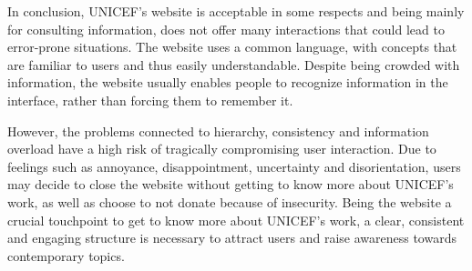 In conclusion, UNICEF’s website is acceptable in some respects and being mainly for consulting information, does not offer many interactions that could lead to error-prone situations. The website uses a common language, with concepts that are familiar to users and thus easily understandable. Despite being crowded with information, the website usually enables people to recognize information in the interface, rather than forcing them to remember it.

However, the problems connected to hierarchy, consistency and information overload have a high risk of tragically compromising user interaction. Due to feelings such as annoyance, disappointment, uncertainty and disorientation, users may decide to close the website without getting to know more about UNICEF’s work, as well as choose to not donate because of insecurity. Being the website a crucial touchpoint to get to know more about UNICEF’s work, a clear, consistent and engaging structure is necessary to attract users and raise awareness towards contemporary topics.


